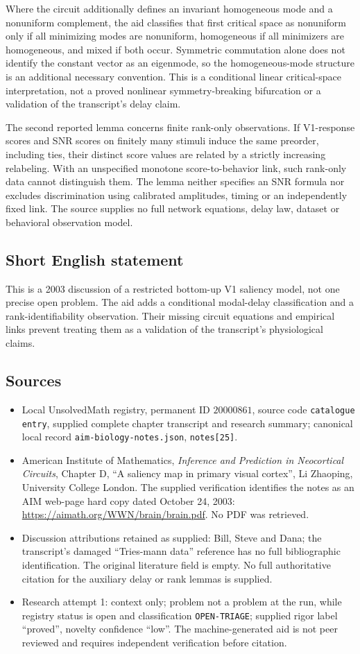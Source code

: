 \documentclass[11pt]{article}
\begin{document}
Where the circuit additionally defines an invariant homogeneous mode and a nonuniform complement, the aid classifies that first critical space as nonuniform only if all minimizing modes are nonuniform, homogeneous if all minimizers are homogeneous, and mixed if both occur. Symmetric commutation alone does not identify the constant vector as an eigenmode, so the homogeneous-mode structure is an additional necessary convention. This is a conditional linear critical-space interpretation, not a proved nonlinear symmetry-breaking bifurcation or a validation of the transcript's delay claim.

The second reported lemma concerns finite rank-only observations. If V1-response scores and SNR scores on finitely many stimuli induce the same preorder, including ties, their distinct score values are related by a strictly increasing relabeling. With an unspecified monotone score-to-behavior link, such rank-only data cannot distinguish them. The lemma neither specifies an SNR formula nor excludes discrimination using calibrated amplitudes, timing or an independently fixed link. The source supplies no full network equations, delay law, dataset or behavioral observation model.
\subsection{Short English statement}
This is a 2003 discussion of a restricted bottom-up V1 saliency model, not one precise open problem. The aid adds a conditional modal-delay classification and a rank-identifiability observation. Their missing circuit equations and empirical links prevent treating them as a validation of the transcript's physiological claims.
\subsection{Sources}
\begin{itemize}
\item Local UnsolvedMath registry, permanent ID $20000861$, source code \texttt{catalogue entry}, supplied complete chapter transcript and research summary; canonical local record \texttt{aim-biology-notes.json}, \texttt{notes[25]}.
\item American Institute of Mathematics, \emph{Inference and Prediction in Neocortical Circuits}, Chapter D, ``A saliency map in primary visual cortex'', Li Zhaoping, University College London. The supplied verification identifies the notes as an AIM web-page hard copy dated October 24, 2003: \url{https://aimath.org/WWN/brain/brain.pdf}. No PDF was retrieved.
\item Discussion attributions retained as supplied: Bill, Steve and Dana; the transcript's damaged ``Tries-mann data'' reference has no full bibliographic identification. The original literature field is empty. No full authoritative citation for the auxiliary delay or rank lemmas is supplied.
\item Research attempt 1: context only; problem not a problem at the run, while registry status is open and classification \texttt{OPEN-TRIAGE}; supplied rigor label ``proved'', novelty confidence ``low''. The machine-generated aid is not peer reviewed and requires independent verification before citation.
\end{itemize}
\end{document}
